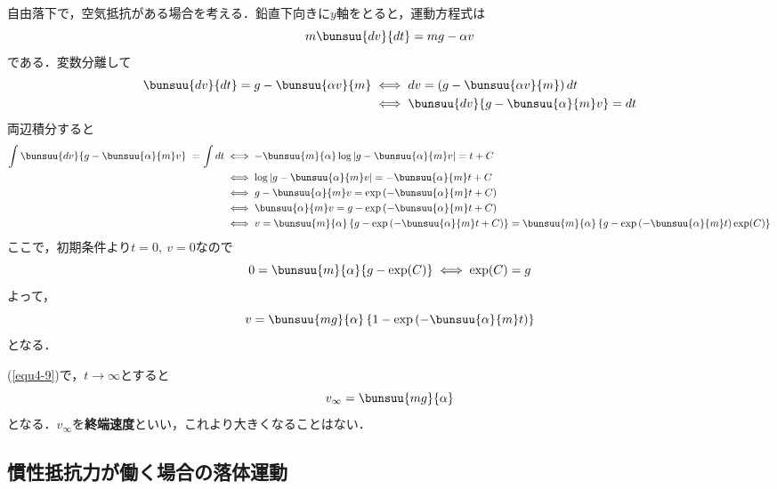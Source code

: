 自由落下で，空気抵抗がある場合を考える．鉛直下向きに$y$軸をとると，運動方程式は
\begin{equation}
	m\bunsuu{dv}{dt} = mg - \alpha v
\end{equation}
である．変数分離して
\begin{align*}
	\bunsuu{dv}{dt} = g - \bunsuu{\alpha v}{m} &
	\iff dv = \left(g - \bunsuu{\alpha v}{m}\right)dt\\
	& \iff \bunsuu{dv}{g - \bunsuu{\alpha}{m}v} = dt
\end{align*}
両辺積分すると
\begin{align*}
	\int \bunsuu{dv}{g - \bunsuu{\alpha}{m}v}\ = \int dt
	&\iff -\bunsuu{m}{\alpha}\log\left|g - \bunsuu{\alpha}{m}v\right| = t + C\\
	&\iff \log\left|g - \bunsuu{\alpha}{m}v\right| = -\bunsuu{\alpha}{m}t + C\\
	&\iff g - \bunsuu{\alpha}{m}v = \exp\left(-\bunsuu{\alpha}{m}t + C\right)\\
	&\iff \bunsuu{\alpha}{m} v = g - \exp\left(-\bunsuu{\alpha}{m}t + C\right)\\
	&\iff v = \bunsuu{m}{\alpha}\left\{g - \exp\left(-\bunsuu{\alpha}{m}t + C\right)\right\} = \bunsuu{m}{\alpha}\left\{g - \exp\left(-\bunsuu{\alpha}{m}t\right)\exp(C)\right\}
\end{align*}
ここで，初期条件より$t = 0,\ v = 0$なので
\begin{equation*}
	0 = \bunsuu{m}{\alpha}\{g - \exp(C)\} \iff \exp(C) = g
\end{equation*}
よって，
\begin{equation}
	v = \bunsuu{mg}{\alpha}\left\{1 - \exp\left(-\bunsuu{\alpha}{m}t\right)\right\} \label{equ4-9}
\end{equation}
となる．

(\ref{equ4-9})で，$t \to \infty$とすると
\begin{equation}
	v_{\infty} = \bunsuu{mg}{\alpha}
\end{equation}
となる．$v_{\infty}$を\textbf{終端速度}といい，これより大きくなることはない．



\subsection{慣性抵抗力が働く場合の落体運動}

